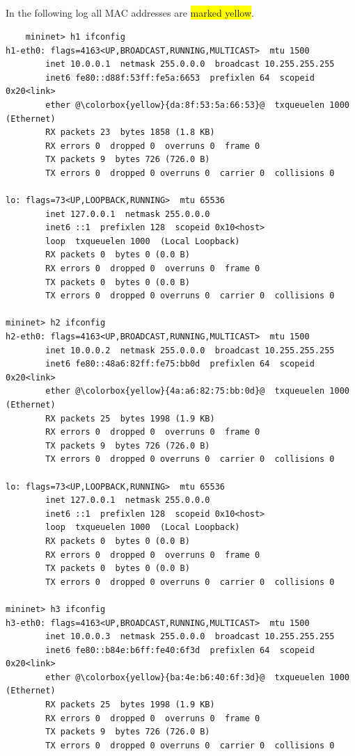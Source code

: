\documentclass{article}
\begin{document}
    \subsection{}
    In the following log all MAC addresses are \colorbox{yellow}{marked yellow}.
    \begin{verbatim}
    mininet> h1 ifconfig
h1-eth0: flags=4163<UP,BROADCAST,RUNNING,MULTICAST>  mtu 1500
        inet 10.0.0.1  netmask 255.0.0.0  broadcast 10.255.255.255
        inet6 fe80::d88f:53ff:fe5a:6653  prefixlen 64  scopeid 0x20<link>
        ether @\colorbox{yellow}{da:8f:53:5a:66:53}@  txqueuelen 1000  (Ethernet)
        RX packets 23  bytes 1858 (1.8 KB)
        RX errors 0  dropped 0  overruns 0  frame 0
        TX packets 9  bytes 726 (726.0 B)
        TX errors 0  dropped 0 overruns 0  carrier 0  collisions 0

lo: flags=73<UP,LOOPBACK,RUNNING>  mtu 65536
        inet 127.0.0.1  netmask 255.0.0.0
        inet6 ::1  prefixlen 128  scopeid 0x10<host>
        loop  txqueuelen 1000  (Local Loopback)
        RX packets 0  bytes 0 (0.0 B)
        RX errors 0  dropped 0  overruns 0  frame 0
        TX packets 0  bytes 0 (0.0 B)
        TX errors 0  dropped 0 overruns 0  carrier 0  collisions 0

mininet> h2 ifconfig
h2-eth0: flags=4163<UP,BROADCAST,RUNNING,MULTICAST>  mtu 1500
        inet 10.0.0.2  netmask 255.0.0.0  broadcast 10.255.255.255
        inet6 fe80::48a6:82ff:fe75:bb0d  prefixlen 64  scopeid 0x20<link>
        ether @\colorbox{yellow}{4a:a6:82:75:bb:0d}@  txqueuelen 1000  (Ethernet)
        RX packets 25  bytes 1998 (1.9 KB)
        RX errors 0  dropped 0  overruns 0  frame 0
        TX packets 9  bytes 726 (726.0 B)
        TX errors 0  dropped 0 overruns 0  carrier 0  collisions 0

lo: flags=73<UP,LOOPBACK,RUNNING>  mtu 65536
        inet 127.0.0.1  netmask 255.0.0.0
        inet6 ::1  prefixlen 128  scopeid 0x10<host>
        loop  txqueuelen 1000  (Local Loopback)
        RX packets 0  bytes 0 (0.0 B)
        RX errors 0  dropped 0  overruns 0  frame 0
        TX packets 0  bytes 0 (0.0 B)
        TX errors 0  dropped 0 overruns 0  carrier 0  collisions 0

mininet> h3 ifconfig
h3-eth0: flags=4163<UP,BROADCAST,RUNNING,MULTICAST>  mtu 1500
        inet 10.0.0.3  netmask 255.0.0.0  broadcast 10.255.255.255
        inet6 fe80::b84e:b6ff:fe40:6f3d  prefixlen 64  scopeid 0x20<link>
        ether @\colorbox{yellow}{ba:4e:b6:40:6f:3d}@  txqueuelen 1000  (Ethernet)
        RX packets 25  bytes 1998 (1.9 KB)
        RX errors 0  dropped 0  overruns 0  frame 0
        TX packets 9  bytes 726 (726.0 B)
        TX errors 0  dropped 0 overruns 0  carrier 0  collisions 0


\end{verbatim}
\end{document}
